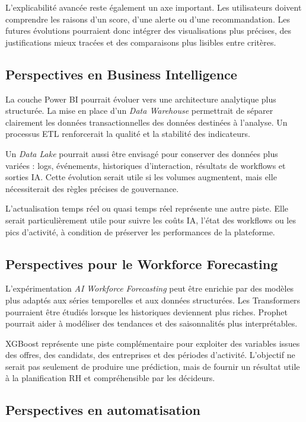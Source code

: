 L'explicabilité avancée reste également un axe important. Les utilisateurs doivent comprendre les raisons d'un score, d'une alerte ou d'une recommandation. Les futures évolutions pourraient donc intégrer des visualisations plus précises, des justifications mieux tracées et des comparaisons plus lisibles entre critères.

\subsection{Perspectives en Business Intelligence}

La couche Power BI pourrait évoluer vers une architecture analytique plus structurée. La mise en place d'un \textit{Data Warehouse} permettrait de séparer clairement les données transactionnelles des données destinées à l'analyse. Un processus ETL renforcerait la qualité et la stabilité des indicateurs.

Un \textit{Data Lake} pourrait aussi être envisagé pour conserver des données plus variées : logs, événements, historiques d'interaction, résultats de workflows et sorties IA. Cette évolution serait utile si les volumes augmentent, mais elle nécessiterait des règles précises de gouvernance.

L'actualisation temps réel ou quasi temps réel représente une autre piste. Elle serait particulièrement utile pour suivre les coûts IA, l'état des workflows ou les pics d'activité, à condition de préserver les performances de la plateforme.

\subsection{Perspectives pour le Workforce Forecasting}

L'expérimentation \textit{AI Workforce Forecasting} peut être enrichie par des modèles plus adaptés aux séries temporelles et aux données structurées. Les Transformers pourraient être étudiés lorsque les historiques deviennent plus riches. Prophet pourrait aider à modéliser des tendances et des saisonnalités plus interprétables.

XGBoost représente une piste complémentaire pour exploiter des variables issues des offres, des candidats, des entreprises et des périodes d'activité. L'objectif ne serait pas seulement de produire une prédiction, mais de fournir un résultat utile à la planification RH et compréhensible par les décideurs.

\subsection{Perspectives en automatisation}

